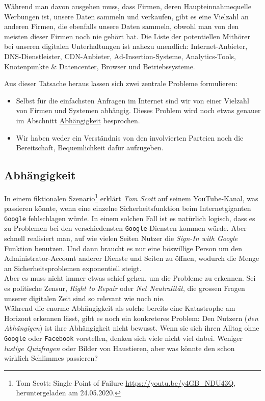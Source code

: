 \documentclass[a4paper,11pt,titlepage,twoside]{memoir}
\begin{document}
\noindent Während man davon ausgehen muss, dass Firmen, deren
Haupteinnahmequelle Werbungen ist, unsere Daten sammeln und verkaufen,
gibt es eine Vielzahl an anderen Firmen, die ebenfalls unsere Daten
sammeln, obwohl man von den meisten dieser Firmen noch nie gehört hat.
Die Liste der potentiellen Mithörer bei unseren digitalen
Unterhaltungen ist nahezu unendlich: Internet-Anbieter,
DNS-Dienstleister, CDN-Anbieter, Ad-Insertion-Systeme,
Analytics-Tools, Knotenpunkte \& Datencenter, Browser und
Betriebssysteme.

\noindent Aus dieser Tatsache heraus lassen sich zwei zentrale
Probleme formulieren:
\begin{itemize}
\item Selbst für die einfachsten Anfragen im Internet sind wir von einer
Vielzahl von Firmen und Systemen abhängig. Dieses Problem wird noch
etwas genauer im Abschnitt \hyperref[sec:org0cabbf1]{Abhängigkeit} besprochen.
\item Wir haben weder ein Verständnis von den involvierten Parteien noch
die Bereitschaft, Bequemlichkeit dafür aufzugeben.
\end{itemize}
\subsection{Abhängigkeit}
\label{sec:org0cabbf1}
In einem fiktionalen Szenario\footnote{Tom Scott: Single Point of Failure
\url{https://youtu.be/y4GB\_NDU43Q}, heruntergeladen am 24.05.2020.} erklärt \emph{Tom Scott} auf seinem
YouTube-Kanal, was passieren könnte, wenn eine einzelne
Sicherheitsfunktion beim Internetgiganten \texttt{Google} fehlschlagen würde.
In einem solchen Fall ist es natürlich logisch, dass es zu Problemen
bei den verschiedensten \texttt{Google}-Diensten kommen würde. Aber schnell
realisiert man, auf wie vielen Seiten Nutzer die \emph{Sign-In with Google}
Funktion benutzen. Und dann braucht es nur eine böswillige Person um
den Administrator-Account anderer Dienste und Seiten zu öffnen,
wodurch die Menge an Sicherheitsproblemen exponentiell steigt.\\

\noindent Aber es muss nicht immer etwas schief gehen, um die Probleme
zu erkennen. Sei es politische Zensur, \emph{Right to Repair} oder \emph{Net
Neutralität}, die grossen Fragen unserer digitalen Zeit sind so
relevant wie noch nie.\\

\noindent Während die enorme Abhängigkeit als solche bereits eine
Katastrophe am Horizont erkennen lässt, gibt es noch ein konkreteres
Problem: Den Nutzern (\emph{den Abhängigen}) ist ihre Abhängigkeit nicht
bewusst. Wenn sie sich ihren Alltag ohne \texttt{Google} oder \texttt{Facebook}
vorstellen, denken sich viele nicht viel dabei. Weniger \emph{lustige
Quizfragen} oder Bilder von Haustieren, aber was könnte den schon
wirklich Schlimmes passieren?\\
\end{document}
